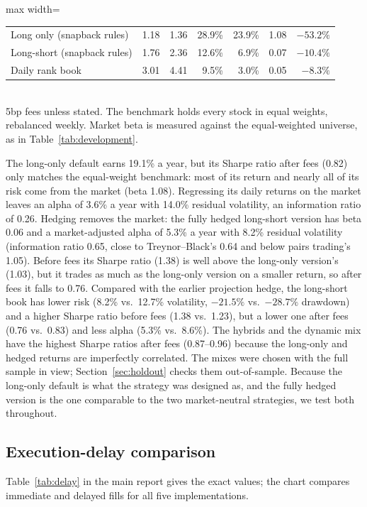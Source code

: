 \documentclass[11pt,letterpaper]{article}
\begin{document}
\begin{table}[!htbp]
\begin{adjustbox}{max width=\linewidth}
\begin{tabular}{lrrrrrr}
Long only (snapback rules) & 1.18 & 1.36 & 28.9\% & 23.9\% & 1.08 & $-53.2\%$ \\
Long-short (snapback rules) & 1.76 & 2.36 & 12.6\% & 6.9\% & 0.07 & $-10.4\%$ \\
Daily rank book & 3.01 & 4.41 & 9.5\% & 3.0\% & 0.05 & $-8.3\%$ \\
\bottomrule
\end{tabular}
\end{adjustbox}
\\[4pt]
\small 5bp fees unless stated. The benchmark holds every stock in equal weights, rebalanced weekly. Market beta is measured against the equal-weighted universe, as in Table~\ref{tab:development}.
\end{table}

The long-only default earns 19.1\% a year, but its Sharpe ratio after fees (0.82) only matches the equal-weight benchmark: most of its return and nearly all of its risk come from the market (beta 1.08). Regressing its daily returns on the market leaves an alpha of 3.6\% a year with 14.0\% residual volatility, an information ratio of 0.26. Hedging removes the market: the fully hedged long-short version has beta 0.06 and a market-adjusted alpha of 5.3\% a year with 8.2\% residual volatility (information ratio 0.65, close to Treynor--Black's 0.64 and below pairs trading's 1.05). Before fees its Sharpe ratio (1.38) is well above the long-only version's (1.03), but it trades as much as the long-only version on a smaller return, so after fees it falls to 0.76. Compared with the earlier projection hedge, the long-short book has lower risk (8.2\% vs.\ 12.7\% volatility, $-21.5\%$ vs.\ $-28.7\%$ drawdown) and a higher Sharpe ratio before fees (1.38 vs.\ 1.23), but a lower one after fees (0.76 vs.\ 0.83) and less alpha (5.3\% vs.\ 8.6\%). The hybrids and the dynamic mix have the highest Sharpe ratios after fees (0.87--0.96) because the long-only and hedged returns are imperfectly correlated. The mixes were chosen with the full sample in view; Section~\ref{sec:holdout} checks them out-of-sample. Because the long-only default is what the strategy was designed as, and the fully hedged version is the one comparable to the two market-neutral strategies, we test both throughout.



\subsection{Execution-delay comparison}
Table~\ref{tab:delay} in the main report gives the exact values; the chart compares immediate and delayed fills for all five implementations.
\end{document}

